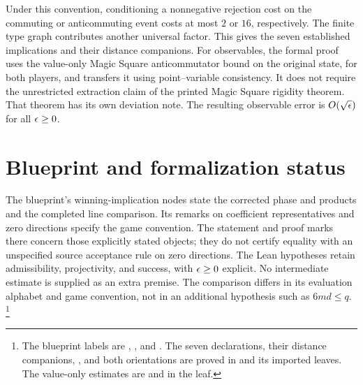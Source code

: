 \documentclass[11pt]{article}
\begin{document}
Under this convention, conditioning a nonnegative rejection cost on the
commuting or anticommuting event costs at most $2$ or $16$, respectively.
The finite type graph contributes another universal factor. This gives the
seven established implications and their distance companions. For observables,
the formal proof uses the value-only Magic Square anticommutator bound on the
original state, for both players, and transfers it using point--variable
consistency. It does not require the unrestricted extraction claim of the
printed Magic Square rigidity theorem. That theorem has its own deviation
note. The resulting observable error is $O(\sqrt{\epsilon})$ for all $\epsilon\geq0$.

\section{Blueprint and formalization status}

The blueprint's winning-implication nodes state the corrected phase and products
and the completed line comparison. Its remarks on coefficient representatives
and zero directions specify the game convention. The statement and proof
marks there concern those explicitly stated objects; they do not certify
equality with an unspecified source acceptance rule on zero directions.
The Lean hypotheses retain admissibility, projectivity, and success, with
$\epsilon\geq0$ explicit. No intermediate estimate is supplied as an extra premise.
The comparison differs in its evaluation alphabet and game convention, not in
an additional hypothesis such as $6md\leq q$.%
\footnote{The blueprint labels are ,
, and
. The seven  declarations,
their distance companions, , and both
 orientations are proved in
 and its imported
leaves. The value-only estimates are
 and
 in the
 leaf.}
\end{document}

